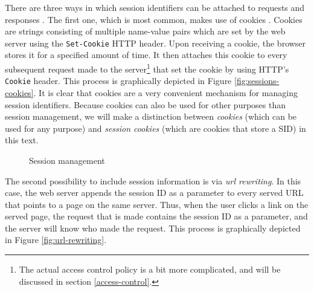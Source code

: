 There are three ways in which session identifiers can be attached to requests and responses \cite{Jovanovic2006}. The first one, which is most common, makes use of \glspl{cookie} \cite{Kristol2001, Park2000}. Cookies are strings consisting of multiple name-value pairs which are set by the web server using the \texttt{Set-Cookie} HTTP header. Upon receiving a cookie, the browser stores it for a specified amount of time. It then attaches this cookie to every subsequent request made to the server\footnote{The actual access control policy is a bit more complicated, and will be discussed in section \ref{access-control}.} that set the cookie by using HTTP's \texttt{Cookie} header. This process is graphically depicted in Figure \ref{fig:sessions-cookies}. It is clear that cookies are a very convenient mechanism for managing session identifiers. Because cookies can also be used for other purposes than session management, we will make a distinction between \emph{cookies} (which can be used for any purpose) and \emph{\glspl{session cookie}} (which are cookies that store a SID) in this text.

\begin{figure}[ht]
	\centering
	\caption{Session management}
\end{figure}

The second possibility to include session information is via \emph{\gls{url} rewriting}. In this case, the web server appends the session ID as a parameter to every served URL that points to a page on the same server. Thus, when the user clicks a link on the served page, the request that is made contains the session ID as a parameter, and the server will know who made the request. This process is graphically depicted in Figure \ref{fig:url-rewriting}.

